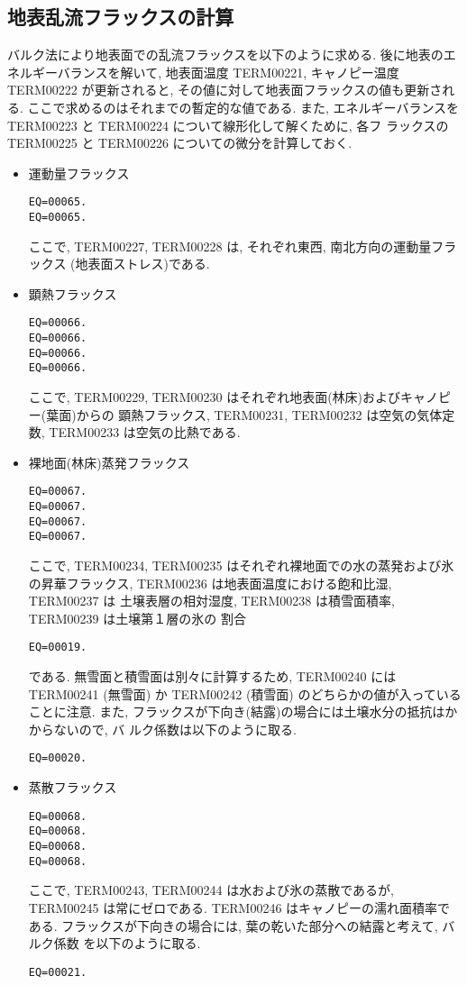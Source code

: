 \subsection{地表乱流フラックスの計算}

バルク法により地表面での乱流フラックスを以下のように求める.
後に地表のエネルギーバランスを解いて, 地表面温度 TERM00221, キャノピー温度
TERM00222 が更新されると, その値に対して地表面フラックスの値も更新される.
ここで求めるのはそれまでの暫定的な値である.
また, エネルギーバランスを TERM00223 と TERM00224 について線形化して解くために, 各フ
ラックスの TERM00225 と TERM00226 についての微分を計算しておく.

\begin{itemize}

\item 運動量フラックス
 \begin{verbatim}
EQ=00065.
EQ=00065.
\end{verbatim}
ここで, TERM00227, TERM00228 は, それぞれ東西, 南北方向の運動量フラックス
(地表面ストレス)である.

\item 顕熱フラックス
 \begin{verbatim}
EQ=00066.
EQ=00066.
EQ=00066.
EQ=00066.
\end{verbatim}
ここで, TERM00229, TERM00230 はそれぞれ地表面(林床)およびキャノピー(葉面)からの
顕熱フラックス, TERM00231, TERM00232 は空気の気体定数,
TERM00233 は空気の比熱である.

\item 裸地面(林床)蒸発フラックス
 \begin{verbatim}
EQ=00067.
EQ=00067.
EQ=00067.
EQ=00067.
\end{verbatim}
ここで, TERM00234, TERM00235 はそれぞれ裸地面での水の蒸発および氷
の昇華フラックス, TERM00236 は地表面温度における飽和比湿, TERM00237 は
土壌表層の相対湿度, TERM00238 は積雪面積率, TERM00239 は土壌第１層の氷の
割合
 \begin{verbatim}
EQ=00019.
\end{verbatim}
である.
無雪面と積雪面は別々に計算するため, TERM00240 には TERM00241 (無雪面) か TERM00242
(積雪面) のどちらかの値が入っていることに注意.
また, フラックスが下向き(結露)の場合には土壌水分の抵抗はかからないので, バ
ルク係数は以下のように取る.
 \begin{verbatim}
EQ=00020.
\end{verbatim}

\item 蒸散フラックス
 \begin{verbatim}
EQ=00068.
EQ=00068.
EQ=00068.
EQ=00068.
\end{verbatim}
ここで, TERM00243, TERM00244 は水および氷の蒸散であるが,
TERM00245 は常にゼロである.
TERM00246 はキャノピーの濡れ面積率である.
フラックスが下向きの場合には, 葉の乾いた部分への結露と考えて, バルク係数
を以下のように取る.
 \begin{verbatim}
EQ=00021.
\end{verbatim}


\end{itemize}
